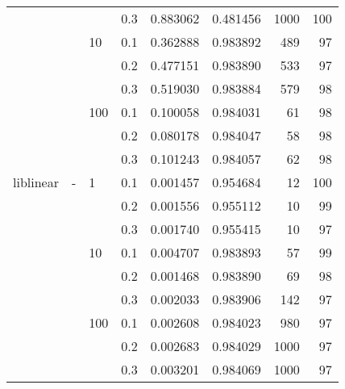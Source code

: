 \begin{table}[H]
\begin{tabular}{llllrrrr}
          &   &     & 0.3 &  0.883062 &  0.481456 &    1000 &   100 \\
          &   & 10  & 0.1 &  0.362888 &  0.983892 &     489 &    97 \\
          &   &     & 0.2 &  0.477151 &  0.983890 &     533 &    97 \\
          &   &     & 0.3 &  0.519030 &  0.983884 &     579 &    98 \\
          &   & 100 & 0.1 &  0.100058 &  0.984031 &      61 &    98 \\
          &   &     & 0.2 &  0.080178 &  0.984047 &      58 &    98 \\
          &   &     & 0.3 &  0.101243 &  0.984057 &      62 &    98 \\
liblinear & - & 1   & 0.1 &  0.001457 &  0.954684 &      12 &   100 \\
          &   &     & 0.2 &  0.001556 &  0.955112 &      10 &    99 \\
          &   &     & 0.3 &  0.001740 &  0.955415 &      10 &    97 \\
          &   & 10  & 0.1 &  0.004707 &  0.983893 &      57 &    99 \\
          &   &     & 0.2 &  0.001468 &  0.983890 &      69 &    98 \\
          &   &     & 0.3 &  0.002033 &  0.983906 &     142 &    97 \\
          &   & 100 & 0.1 &  0.002608 &  0.984023 &     980 &    97 \\
          &   &     & 0.2 &  0.002683 &  0.984029 &    1000 &    97 \\
          &   &     & 0.3 &  0.003201 &  0.984069 &    1000 &    97 \\
\bottomrule
\end{tabular}
\end{table}
